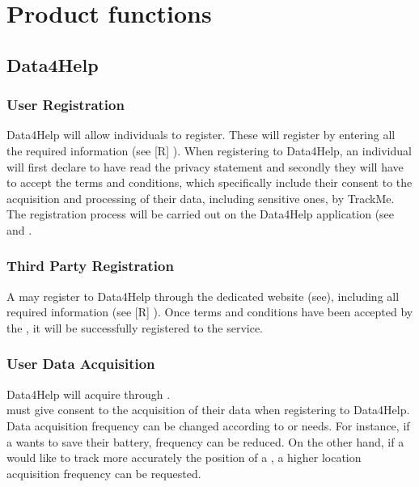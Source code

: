 \documentclass[../../rasd.tex]{subfiles}
\begin{document}
\section{Product functions}
			\subsection{Data4Help}
			
				\subsubsection{User Registration}
				Data4Help will allow individuals to register. These will register by entering all the required information (see [R] ). When registering to Data4Help, an individual will first declare to have read the privacy statement and secondly they will have to accept the terms and conditions, which specifically include their consent to the acquisition and processing of their data, including sensitive ones, by TrackMe.\\
				The  registration process will be carried out on the Data4Help application (see  and .\\
			
				\subsubsection{Third Party Registration}
				A  may register to Data4Help through the  dedicated website (see), including all required information (see [R] ).
				Once terms and conditions have been accepted by the , it will be successfully registered to the service.\\
							
				\subsubsection{User Data Acquisition}
				Data4Help will acquire  through . \\
				 must give consent to the acquisition of their data when registering to Data4Help.\\
				Data acquisition frequency can be changed according to  or  needs. For instance, if a  wants to save their  battery, frequency can be reduced. On the other hand, if a  would like to track more accurately the position of a , a higher location acquisition frequency can be requested.
\end{document}
